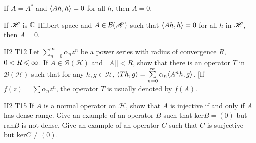 \begin{corollary}{}{}
    If $A=A^*$ and $\langle Ah,h\rangle=0$ for all $h$, then $A=0$.
\end{corollary}

\begin{proposition}{}{}
    If $\mathscr{H}$ is $\mathbb{C}$-Hilbert space and $A\in \mathcal{B}(\mathscr{H})$ such that $\langle Ah,h\rangle=0$ for all $h$ in $\mathscr{H}$, then $A=0$.
\end{proposition}

\begin{exercise}{II2 T12}{}
    Let $\sum\limits_{n=0}^{\infty}\alpha_nz^n$ be a power series with radius of convergence $R$, $0<R\leqslant \infty$.
    If $A\in \mathscr{B}(\mathscr{H})$ and $||A||<R$,
    show that there is an operator $T$ in $\mathscr{B}(\mathscr{H})$ such that for any $h,g\in \mathscr{H}$,
    $\langle Th,g\rangle=\sum\limits_{n=0}^{\infty}\alpha_n\langle A^nh,g\rangle$.
    [If $f(z)=\sum\alpha_nz^n$, the operator $T$ is usually denoted by $f(A)$.]
\end{exercise}

\begin{exercise}{II2 T15}{}
    If $A$ is a normal operator on $\mathscr{H}$, show that $A$ is injective if and only if $A$ has dense range.
    Give an example of an operator $B$ such that ker$B=(0)$ but ran$B$ is not dense.
    Give an example of an operator $C$ such that $C$ is surjective but ker$C\neq (0)$.
\end{exercise}
